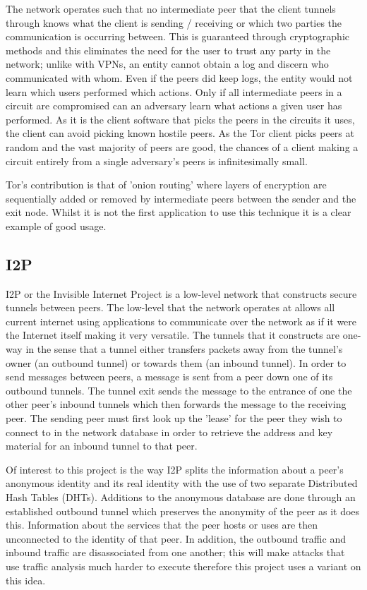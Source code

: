 \documentclass[ %
                    author={Luke Murray},
                supervisor={Dr. Simon Hollis},
                     title={Shadow Peer-to-Peer Networks},
                  subtitle={},
                    degree={MEng},
                      year={2013} ]{thesis}
\begin{document}
The network operates such that no intermediate peer that the client tunnels through knows what the client is sending / receiving or which two parties the communication is occurring between. This is guaranteed through cryptographic methods and this eliminates the need for the user to trust any party in the network; unlike with VPNs, an entity cannot obtain a log and discern who communicated with whom. Even if the peers did keep logs, the entity would not learn which users performed which actions. Only if all intermediate peers in a circuit are compromised can an adversary learn what actions a given user has performed. As it is the client software that picks the peers in the circuits it uses, the client can avoid picking known hostile peers. As the Tor client picks peers at random and the vast majority of peers are good, the chances of a client making a circuit entirely from a single adversary's peers is infinitesimally small.

Tor's contribution is that of 'onion routing' where layers of encryption are sequentially added or removed by intermediate peers between the sender and the exit node. Whilst it is not the first application to use this technique it is a clear example of good usage.

\subsection{I2P}

I2P\cite{I2P} or the Invisible Internet Project is a low-level network that constructs secure tunnels between peers. The low-level that the network operates at allows all current internet using applications to communicate over the network as if it were the Internet itself making it very versatile. The tunnels that it constructs are one-way in the sense that a tunnel either transfers packets away from the tunnel's owner (an outbound tunnel) or towards them (an inbound tunnel). In order to send messages between peers, a message is sent from a peer down one of its outbound tunnels. The tunnel exit sends the message to the entrance of one the other peer's inbound tunnels which then forwards the message to the receiving peer. The sending peer must first look up the 'lease' for the peer they wish to connect to in the network database in order to retrieve the address and key material for an inbound tunnel to that peer.

Of interest to this project is the way I2P splits the information about a peer's anonymous identity and its real identity with the use of two separate Distributed Hash Tables (DHTs). Additions to the anonymous database are done through an established outbound tunnel which preserves the anonymity of the peer as it does this. Information about the services that the peer hosts or uses are then unconnected to the identity of that peer. In addition, the outbound traffic and inbound traffic are disassociated from one another; this will make attacks that use traffic analysis much harder to execute therefore this project uses a variant on this idea.
\end{document}
